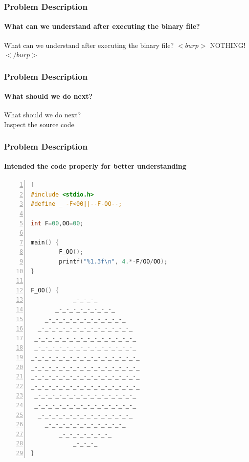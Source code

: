 \documentclass[12pt]{beamer}
\begin{document}
\begin{frame}
	\frametitle{Problem Description}
	\framesubtitle{What can we understand after executing the binary file?}
	\begin{center}
		\small What can we understand after executing the binary file?
		\small{$<burp>$} \huge {NOTHING!} \small {$</burp>$}
	\end{center}
\end{frame}

\begin{frame}
	\frametitle{Problem Description}
	\framesubtitle{What should we do next?}
	\begin{center}
		\small {What should we do next?} \\
		\large Inspect the source code
	\end{center}
\end{frame}

\begin{frame}[fragile]
	\frametitle{Problem Description}
	\framesubtitle{Intended the code properly for better understanding}
	\begin{lstlisting}[language=C, breaklines=true, commentstyle=\color{mygreen}, rulecolor=\color{black}, numbers=left,  numbersep=2pt, numberstyle=\tiny\color{mygray}] ]
#include <stdio.h>
#define _ -F<00||--F-OO--;

int F=00,OO=00;

main() {
        F_OO();
        printf("%1.3f\n", 4.*-F/OO/OO);
}

F_OO() {
            _-_-_-_
       _-_-_-_-_-_-_-_-_
    _-_-_-_-_-_-_-_-_-_-_-_
  _-_-_-_-_-_-_-_-_-_-_-_-_-_
 _-_-_-_-_-_-_-_-_-_-_-_-_-_-_
 _-_-_-_-_-_-_-_-_-_-_-_-_-_-_
_-_-_-_-_-_-_-_-_-_-_-_-_-_-_-_
_-_-_-_-_-_-_-_-_-_-_-_-_-_-_-_
_-_-_-_-_-_-_-_-_-_-_-_-_-_-_-_
_-_-_-_-_-_-_-_-_-_-_-_-_-_-_-_
 _-_-_-_-_-_-_-_-_-_-_-_-_-_-_
 _-_-_-_-_-_-_-_-_-_-_-_-_-_-_
  _-_-_-_-_-_-_-_-_-_-_-_-_-_
    _-_-_-_-_-_-_-_-_-_-_-_
        _-_-_-_-_-_-_-_
            _-_-_-_
}
	\end{lstlisting}

\end{frame}
\end{document}
